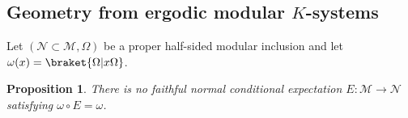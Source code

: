 \documentclass[a4paper,11pt]{article}
\newtheorem{proposition}[theorem]{Proposition}
\theoremstyle{definition}
\begin{document}


\subsection{Geometry from ergodic modular $K$-systems}



Let $(\mathcal N\subset\mathcal M,\Omega)$ be a proper half-sided modular
inclusion and let $\omega(x)=\braket{\Omega|x\Omega}$.

\begin{proposition}\label{prop:no-vacuum-expectation}
There is no faithful normal conditional expectation
$E:\mathcal M\to\mathcal N$ satisfying $\omega\circ E=\omega$.
\end{proposition}
\end{document}

